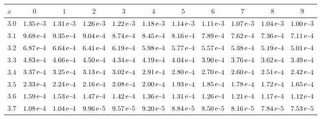 
\begin{table}[htb!]
\begin{center}
{\scriptsize
\renewcommand\arraystretch{1.250000}
\begin{tabular}{p{22 pt}cccccccccc}
\hline

\rule[-2pt]{0pt}{14pt}$x$ & $0$ & $1$ & $2$ & $3$ & $4$ & $5$ & $6$ & $7$ & $8$ & $9$\\
\hline
\hline
\rule[0pt]{0pt}{15pt}$3.0$ & $1.35\,{\rm e}$-$3$ & $1.31\,{\rm e}$-$3$ & $1.26\,{\rm e}$-$3$ & $1.22\,{\rm e}$-$3$ & $1.18\,{\rm e}$-$3$ & $1.14\,{\rm e}$-$3$ & $1.11\,{\rm e}$-$3$ & $1.07\,{\rm e}$-$3$ & $1.04\,{\rm e}$-$3$ & $1.00\,{\rm e}$-$3$\\
$3.1$ & $9.68\,{\rm e}$-$4$ & $9.35\,{\rm e}$-$4$ & $9.04\,{\rm e}$-$4$ & $8.74\,{\rm e}$-$4$ & $8.45\,{\rm e}$-$4$ & $8.16\,{\rm e}$-$4$ & $7.89\,{\rm e}$-$4$ & $7.62\,{\rm e}$-$4$ & $7.36\,{\rm e}$-$4$ & $7.11\,{\rm e}$-$4$\\
$3.2$ & $6.87\,{\rm e}$-$4$ & $6.64\,{\rm e}$-$4$ & $6.41\,{\rm e}$-$4$ & $6.19\,{\rm e}$-$4$ & $5.98\,{\rm e}$-$4$ & $5.77\,{\rm e}$-$4$ & $5.57\,{\rm e}$-$4$ & $5.38\,{\rm e}$-$4$ & $5.19\,{\rm e}$-$4$ & $5.01\,{\rm e}$-$4$\\
$3.3$ & $4.83\,{\rm e}$-$4$ & $4.66\,{\rm e}$-$4$ & $4.50\,{\rm e}$-$4$ & $4.34\,{\rm e}$-$4$ & $4.19\,{\rm e}$-$4$ & $4.04\,{\rm e}$-$4$ & $3.90\,{\rm e}$-$4$ & $3.76\,{\rm e}$-$4$ & $3.62\,{\rm e}$-$4$ & $3.49\,{\rm e}$-$4$\\
$3.4$ & $3.37\,{\rm e}$-$4$ & $3.25\,{\rm e}$-$4$ & $3.13\,{\rm e}$-$4$ & $3.02\,{\rm e}$-$4$ & $2.91\,{\rm e}$-$4$ & $2.80\,{\rm e}$-$4$ & $2.70\,{\rm e}$-$4$ & $2.60\,{\rm e}$-$4$ & $2.51\,{\rm e}$-$4$ & $2.42\,{\rm e}$-$4$\\
$3.5$ & $2.33\,{\rm e}$-$4$ & $2.24\,{\rm e}$-$4$ & $2.16\,{\rm e}$-$4$ & $2.08\,{\rm e}$-$4$ & $2.00\,{\rm e}$-$4$ & $1.93\,{\rm e}$-$4$ & $1.85\,{\rm e}$-$4$ & $1.78\,{\rm e}$-$4$ & $1.72\,{\rm e}$-$4$ & $1.65\,{\rm e}$-$4$\\
$3.6$ & $1.59\,{\rm e}$-$4$ & $1.53\,{\rm e}$-$4$ & $1.47\,{\rm e}$-$4$ & $1.42\,{\rm e}$-$4$ & $1.36\,{\rm e}$-$4$ & $1.31\,{\rm e}$-$4$ & $1.26\,{\rm e}$-$4$ & $1.21\,{\rm e}$-$4$ & $1.17\,{\rm e}$-$4$ & $1.12\,{\rm e}$-$4$\\
$3.7$ & $1.08\,{\rm e}$-$4$ & $1.04\,{\rm e}$-$4$ & $9.96\,{\rm e}$-$5$ & $9.57\,{\rm e}$-$5$ & $9.20\,{\rm e}$-$5$ & $8.84\,{\rm e}$-$5$ & $8.50\,{\rm e}$-$5$ & $8.16\,{\rm e}$-$5$ & $7.84\,{\rm e}$-$5$ & $7.53\,{\rm e}$-$5$\\

\end{tabular}}
\end{center}
\end{table}
